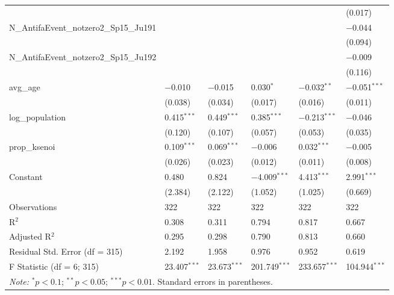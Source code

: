 \documentclass[12pt,letterpaper]{article}
\begin{document}
\begin{table}[!htbp]
\begin{tabularx}{\textwidth}{@{\extracolsep{5pt}}l *{5}{X}@{}}
		&  &  &  &  & (0.017) \\ 
		N\_AntifaEvent\_notzero2\_Sp15\_Ju191 &  &  &  &  & $-$0.044 \\ 
		&  &  &  &  & (0.094) \\ 
		N\_AntifaEvent\_notzero2\_Sp15\_Ju192 &  &  &  &  & $-$0.009 \\ 
		&  &  &  &  & (0.116) \\ 
		avg\_age & $-$0.010 & $-$0.015 & 0.030$^{*}$ & $-$0.032$^{**}$ & $-$0.051$^{***}$ \\ 
		& (0.038) & (0.034) & (0.017) & (0.016) & (0.011) \\ 
		log\_population & 0.415$^{***}$ & 0.449$^{***}$ & 0.385$^{***}$ & $-$0.213$^{***}$ & $-$0.046 \\ 
		& (0.120) & (0.107) & (0.057) & (0.053) & (0.035) \\ 
		prop\_ksenoi & 0.109$^{***}$ & 0.069$^{***}$ & $-$0.006 & 0.032$^{***}$ & $-$0.005 \\ 
		& (0.026) & (0.023) & (0.012) & (0.011) & (0.008) \\ 
		Constant & 0.480 & 0.824 & $-$4.009$^{***}$ & 4.413$^{***}$ & 2.991$^{***}$ \\ 
		& (2.384) & (2.122) & (1.052) & (1.025) & (0.669) \\ 
		\hline 
		Observations & 322 & 322 & 322 & 322 & 322 \\ 
		R$^{2}$ & 0.308 & 0.311 & 0.794 & 0.817 & 0.667 \\ 
		Adjusted R$^{2}$ & 0.295 & 0.298 & 0.790 & 0.813 & 0.660 \\ 
		Residual Std. Error (df = 315) & 2.192 & 1.958 & 0.976 & 0.952 & 0.619 \\ 
		F Statistic (df = 6; 315) & 23.407$^{***}$ & 23.673$^{***}$ & 201.749$^{***}$ & 233.657$^{***}$ & 104.944$^{***}$ \\ 
		\hline 
		\multicolumn{6}{p{\dimexpr\textwidth-2\tabcolsep-2\arrayrulewidth\relax}}{\textit{Note:} $^{*}p<0.1$; $^{**}p<0.05$; $^{***}p<0.01$. Standard errors in parentheses.}
	\end{tabularx} 
\end{table}
\end{document}
